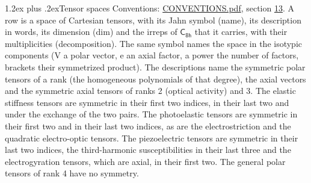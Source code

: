 \documentclass[10pt,a4paper]{article}
\makeatletter
\renewcommand\section{\@startsection{section}{1}{\z@}{-3ex plus -1ex minus -.2ex}%
  {1.2ex plus .2ex}{\normalfont\large\sffamily\bfseries\color{parttitle}}}
\numberwithin{equation}{section}
\newcommand{\grp}[1]{\mathsf{#1}}
\makeatother
\begin{document}
\section{Tensor spaces}\label{s:tensor_spaces}
Conventions: \href{../../CONVENTIONS.pdf}{CONVENTIONS.pdf}, section \href{../../CONVENTIONS.pdf\#conv.13}{13}.
\leavevmode\label{n:head.name}\label{n:head.description}\label{n:head.dim}\label{n:head.decomposition}A row is a space of Cartesian tensors, with its Jahn symbol (name), its description in words, its dimension (dim) and the irreps of $\grp{C_{8h}}$ that it carries, with their multiplicities (decomposition). \label{n:label.jahn}The same symbol names the space in the isotypic components (V a polar vector, e an axial factor, a power the number of factors, brackets their symmetrized product). The descriptions name the symmetric polar tensors of a rank (the homogeneous polynomials of that degree), the axial vectors and the symmetric axial tensors of ranks 2 (optical activity) and 3. The elastic stiffness tensors are symmetric in their first two indices, in their last two and under the exchange of the two pairs. The photoelastic tensors are symmetric in their first two and in their last two indices, as are the electrostriction and the quadratic electro-optic tensors. The piezoelectric tensors are symmetric in their last two indices, the third-harmonic susceptibilities in their last three and the electrogyration tensors, which are axial, in their first two. The general polar tensors of rank 4 have no symmetry.
\end{document}
